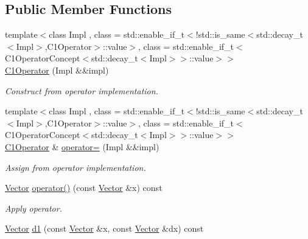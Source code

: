 \subsection*{Public Member Functions}
\begin{DoxyCompactItemize}
\item 
\hypertarget{classSpacy_1_1C1Operator_a70510e1ed6fa3fdd9ebba2a23d76db91}{}{\footnotesize template$<$class Impl , class  = std\+::enable\+\_\+if\+\_\+t$<$!std\+::is\+\_\+same$<$std\+::decay\+\_\+t$<$\+Impl$>$,\+C1\+Operator$>$\+::value$>$, class  = std\+::enable\+\_\+if\+\_\+t$<$\+C1\+Operator\+Concept$<$std\+::decay\+\_\+t$<$\+Impl$>$$>$\+::value$>$$>$ }\\\hyperlink{classSpacy_1_1C1Operator_a70510e1ed6fa3fdd9ebba2a23d76db91}{C1\+Operator} (Impl \&\&impl)\label{classSpacy_1_1C1Operator_a70510e1ed6fa3fdd9ebba2a23d76db91}

\begin{DoxyCompactList}\small\item\em Construct from operator implementation. \end{DoxyCompactList}\item 
\hypertarget{classSpacy_1_1C1Operator_a0f6f030909e49d5d5cb69118d96610f7}{}{\footnotesize template$<$class Impl , class  = std\+::enable\+\_\+if\+\_\+t$<$!std\+::is\+\_\+same$<$std\+::decay\+\_\+t$<$\+Impl$>$,\+C1\+Operator$>$\+::value$>$, class  = std\+::enable\+\_\+if\+\_\+t$<$\+C1\+Operator\+Concept$<$std\+::decay\+\_\+t$<$\+Impl$>$$>$\+::value$>$$>$ }\\\hyperlink{classSpacy_1_1C1Operator}{C1\+Operator} \& \hyperlink{classSpacy_1_1C1Operator_a0f6f030909e49d5d5cb69118d96610f7}{operator=} (Impl \&\&impl)\label{classSpacy_1_1C1Operator_a0f6f030909e49d5d5cb69118d96610f7}

\begin{DoxyCompactList}\small\item\em Assign from operator implementation. \end{DoxyCompactList}\item 
\hypertarget{classSpacy_1_1C1Operator_a2a01bf08bf2b6e44955cd606aa3db91d}{}\hyperlink{classSpacy_1_1Vector}{Vector} \hyperlink{classSpacy_1_1C1Operator_a2a01bf08bf2b6e44955cd606aa3db91d}{operator()} (const \hyperlink{classSpacy_1_1Vector}{Vector} \&x) const \label{classSpacy_1_1C1Operator_a2a01bf08bf2b6e44955cd606aa3db91d}

\begin{DoxyCompactList}\small\item\em Apply operator. \end{DoxyCompactList}\item 
\hypertarget{classSpacy_1_1C1Operator_a1b6a06c88bc4168c750ee4ffdc81f1dd}{}\hyperlink{classSpacy_1_1Vector}{Vector} \hyperlink{classSpacy_1_1C1Operator_a1b6a06c88bc4168c750ee4ffdc81f1dd}{d1} (const \hyperlink{classSpacy_1_1Vector}{Vector} \&x, const \hyperlink{classSpacy_1_1Vector}{Vector} \&dx) const \label{classSpacy_1_1C1Operator_a1b6a06c88bc4168c750ee4ffdc81f1dd}


\end{DoxyCompactItemize}
